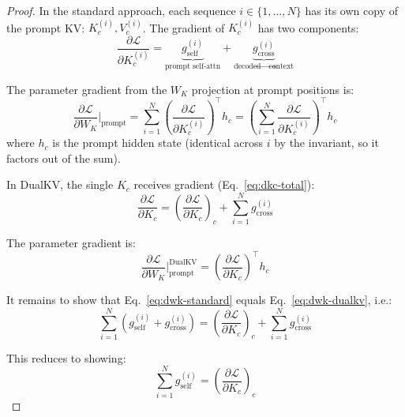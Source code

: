 \documentclass{article}
\begin{document}
\begin{proof}
In the standard approach, each sequence $i \in \{1, \ldots, N\}$ has its own copy of the prompt KV: $K_c^{(i)}, V_c^{(i)}$. The gradient of $K_c^{(i)}$ has two components:
\begin{equation}
  \frac{\partial \mathcal{L}}{\partial K_c^{(i)}} = \underbrace{g_{\text{self}}^{(i)}}_{\text{prompt self-attn}} + \underbrace{g_{\text{cross}}^{(i)}}_{\text{decoded} \to \text{context}}
\end{equation}

The parameter gradient from the $W_K$ projection at prompt positions is:
\begin{equation}
  \frac{\partial \mathcal{L}}{\partial W_K}\bigg|_{\text{prompt}} = \sum_{i=1}^{N} \left(\frac{\partial \mathcal{L}}{\partial K_c^{(i)}}\right)^\top h_c = \left(\sum_{i=1}^{N} \frac{\partial \mathcal{L}}{\partial K_c^{(i)}}\right)^\top h_c
  \label{eq:dwk-standard}
\end{equation}
where $h_c$ is the prompt hidden state (identical across $i$ by the invariant, so it factors out of the sum).

In DualKV, the single $K_c$ receives gradient (Eq.~\ref{eq:dkc-total}):
\begin{equation}
  \frac{\partial \mathcal{L}}{\partial K_c} = \left(\frac{\partial \mathcal{L}}{\partial K_c}\right)_{\!c} + \sum_{i=1}^{N} g_{\text{cross}}^{(i)}
\end{equation}

The parameter gradient is:
\begin{equation}
  \frac{\partial \mathcal{L}}{\partial W_K}\bigg|_{\text{prompt}}^{\text{DualKV}} = \left(\frac{\partial \mathcal{L}}{\partial K_c}\right)^\top h_c
  \label{eq:dwk-dualkv}
\end{equation}

It remains to show that Eq.~\ref{eq:dwk-standard} equals Eq.~\ref{eq:dwk-dualkv}, i.e.:
\begin{equation}
  \sum_{i=1}^{N} \left(g_{\text{self}}^{(i)} + g_{\text{cross}}^{(i)}\right) = \left(\frac{\partial \mathcal{L}}{\partial K_c}\right)_{\!c} + \sum_{i=1}^{N} g_{\text{cross}}^{(i)}
  \label{eq:to-show}
\end{equation}

This reduces to showing:
\begin{equation}
  \sum_{i=1}^{N} g_{\text{self}}^{(i)} = \left(\frac{\partial \mathcal{L}}{\partial K_c}\right)_{\!c}
  \label{eq:self-equiv}
\end{equation}


\end{proof}
\end{document}
